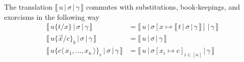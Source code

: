 \documentclass[a4paper,UKenglish,cleveref, autoref]{lipics-v2019}
\newcommand{\fv}[1]{(#1)_{fv}}
\newcommand{\fc}[1]{(#1)_{fc}}
\newcommand{\set}[1]{ \{ #1 \} }
\newcommand{\fake}[3]{#1 \langle \, #2 \, \rangle . #3}
\newcommand{\fakedist}[2]{#1 \langle \, #2 \, \rangle}
\newcommand{\sub}[3]{#1 \{ #2 / #3 \}}
\newcommand{\psub}[3]{#1 \{ #2 / #3 \}_{b}}
\newcommand{\exor}[3]{#1 \{ \fakedist{#2}{#3} \}_{e}}
\newcommand{\readbackwmap}[3]{\llbracket \, #1 \, \vert \, #2 \, \vert \, #3  \, \rrbracket }
\begin{document}
\begin{proposition}
\label{prop:suboutcomm}
\label{prop:bkcomm}
\label{prop:exorcomm}
The translation $\readbackwmap{u}{\sigma}{\gamma}$ commutes with substitutions, book-keepings, and exorcisms in the following way
\begin{align*}
	\readbackwmap{u \sub{}{t}{x}}{\sigma}{\gamma} &= \readbackwmap{u}{\sigma[x \mapsto \readbackwmap{t}{\sigma}{\gamma}]}{\gamma} \\[0.2cm]
	\readbackwmap{u \psub{}{\vec{x}}{c}}{\sigma}{\gamma} &= \readbackwmap{u}{\sigma}{\gamma} \\[0.2cm]
	\readbackwmap{u \exor{}{c}{x_{1}, \dots, x_{n}}}{\sigma}{\gamma} &= \readbackwmap{u}{\sigma[x_{i} \mapsto c]_{i \in [n]}}{\gamma}
\end{align*}

%
\end{proposition}

%

%
%
%
%
%
%
\end{document}
